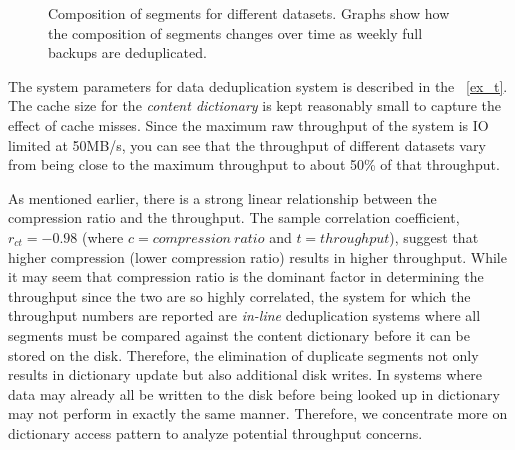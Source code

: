 \begin{figure}[!t]
{{\label{fp}}
\hfil
{}
\hfil
{}
}
\caption{Composition of segments for different datasets. Graphs show how the composition of segments changes over time as weekly full backups are deduplicated.}
\label{fig_sim}
\end{figure}

The system parameters for data deduplication system is described in the \tablename~\ref{ex_t}. The cache size for the \emph{content dictionary} is kept reasonably small to capture the effect of cache misses. Since the maximum raw throughput of the system is IO limited at 50MB/s, you can see that the throughput of different datasets vary from being close to the maximum throughput to about 50\% of that throughput. 

As mentioned earlier, there is a strong linear relationship between the compression ratio and the throughput. The sample correlation coefficient, $r_{ct} = -0.98$ (where $c=compression\ ratio$ and $t=throughput$), suggest that higher compression (lower compression ratio) results in higher throughput. While it may seem that compression ratio is the dominant factor in determining the throughput since the two are so highly correlated, the system for which the throughput numbers are reported are \emph{in-line} deduplication systems where all segments must be compared against the content dictionary before it can be stored on the disk. Therefore, the elimination of duplicate segments not only results in dictionary update but also additional disk writes. In systems where data may already all be written to the disk before being looked up in dictionary may not perform in exactly the same manner. Therefore, we concentrate more on dictionary access pattern to analyze potential throughput concerns.


